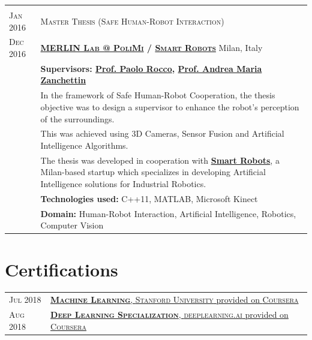 \documentclass[a4paper,10pt]{article}
\begin{document}
\begin{tabular}{p{1.7cm}|p{14.5cm}}
		\multicolumn{2}{c}{} \\
		\centering\textsc{Jan 2016 } & 
		\textsc{Master Thesis (Safe Human-Robot Interaction)} \\
		\centering\textsc{Dec 2016} &
		\textsc{\textbf{\href{http://merlin.dei.polimi.it/}{MERLIN Lab @ PoliMi} / \href{http://smartrobots.it/en/}{Smart Robots}}} \hfill Milan, Italy\\
		& \textbf{Supervisors: \href{http://home.deib.polimi.it/rocco/}{Prof. Paolo Rocco}, \href{https://home.deib.polimi.it/zanchettin/index.html}{Prof. Andrea Maria Zanchettin}}\\
		& In the framework of Safe Human-Robot Cooperation, the thesis objective was to design a supervisor to enhance the robot's perception of the surroundings.\\
		& This was achieved using 3D Cameras, Sensor Fusion and Artificial Intelligence Algorithms.\\
		& The thesis was developed in cooperation with \textbf{\href{http://smartrobots.it/en/}{Smart Robots}}, a Milan-based startup which specializes in developing Artificial Intelligence solutions for Industrial Robotics.\\
		& \textbf{Technologies used:}  C++11, MATLAB, Microsoft Kinect\\
		& \textbf{Domain:} Human-Robot Interaction, Artificial Intelligence, Robotics, Computer Vision\\
	\end{tabular}

	\section{Certifications}
	\begin{tabular}{p{1.7cm}|p{14.5cm}}
		\centering\textsc{Jul 2018} &
		\href{https://www.coursera.org/account/accomplishments/certificate/PHU5XX9EQ5LP}{\textbf{\textsc{Machine Learning}}, \textsc{Stanford University} provided on \textsc{Coursera}} \\
		\centering\textsc{Aug 2018} &
		\href{https://www.coursera.org/account/accomplishments/specialization/certificate/MQRAWL6XD2QW}{\textbf{\textsc{Deep Learning Specialization}}, \textsc{deeplearning.ai} provided on \textsc{Coursera}} \\
	\end{tabular}
\end{document}
